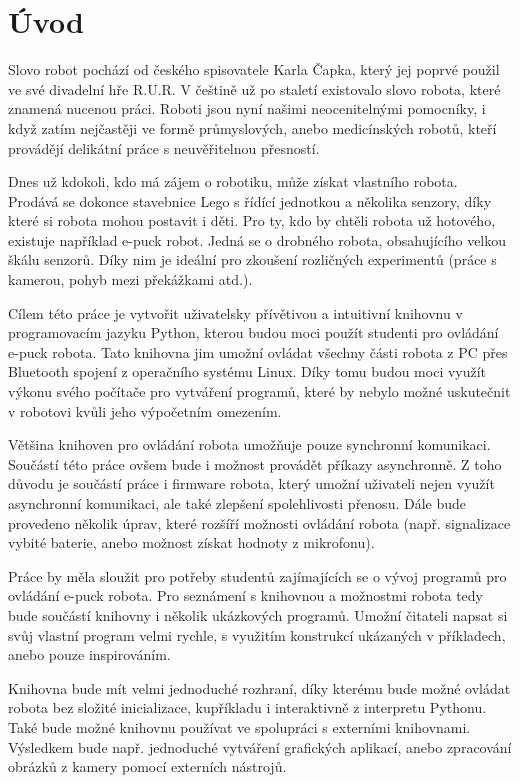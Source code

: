 \chapter*{Úvod}

Slovo robot pochází od českého spisovatele Karla Čapka, který jej poprvé
použil ve své divadelní hře R.U.R. V češtině už po staletí existovalo slovo
robota, které znamená nucenou práci. Roboti jsou nyní našimi neocenitelnými
pomocníky, i když zatím nejčastěji ve formě průmyslových, anebo
medicínských robotů, kteří provádějí delikátní práce s neuvěřitelnou
přesností.

Dnes už kdokoli, kdo má zájem o robotiku, může získat vlastního robota.
Prodává se dokonce stavebnice Lego s řídící jednotkou a několika senzory,
díky které si robota mohou postavit i děti. Pro ty, kdo by chtěli robota už
hotového, existuje například e-puck robot. Jedná se o drobného robota,
obsahujícího velkou škálu senzorů. Díky nim je ideální pro zkoušení
rozličných experimentů (práce s kamerou, pohyb mezi překážkami atd.).

Cílem této práce je vytvořit uživatelsky přívětivou a intuitivní knihovnu v
programovacím jazyku Python, kterou budou moci použít studenti pro ovládání
e-puck robota. Tato knihovna jim umožní ovládat všechny části robota z PC
přes Bluetooth spojení z operačního systému Linux. Díky tomu budou moci
využít výkonu svého počítače pro vytváření programů, které by nebylo možné
uskutečnit v robotovi kvůli jeho výpočetním omezením.

Většina knihoven pro ovládání robota umožňuje pouze synchronní komunikaci.
Součástí této práce ovšem bude i možnost provádět příkazy asynchronně. Z
toho důvodu je součástí práce i firmware robota, který umožní uživateli
nejen využít asynchronní komunikaci, ale také zlepšení spolehlivosti
přenosu. Dále bude provedeno několik úprav, které rozšíří možnosti ovládání
robota (např. signalizace vybité baterie, anebo možnost získat hodnoty z
mikrofonu).

Práce by měla sloužit pro potřeby studentů zajímajících se o vývoj
programů pro ovládání e-puck robota. Pro seznámení s knihovnou a možnostmi
robota tedy bude součástí knihovny i několik ukázkových programů. Umožní
čitateli napsat si svůj vlastní program velmi rychle, s využitím konstrukcí
ukázaných v příkladech, anebo pouze inspirováním.

Knihovna bude mít velmi jednoduché rozhraní, díky kterému bude možné
ovládat robota bez složité inicializace, kupříkladu i interaktivně z
interpretu Pythonu. Také bude možné knihovnu používat ve spolupráci s
externími knihovnami. Výsledkem bude např. jednoduché vytváření grafických
aplikací, anebo zpracování obrázků z kamery pomocí externích nástrojů.

